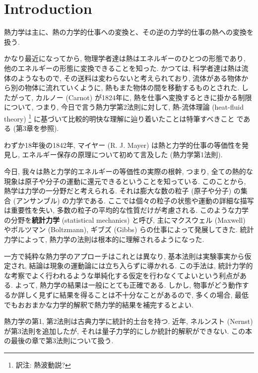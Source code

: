 \chapter{Introduction}
熱力学は主に、熱の力学的仕事への変換と、その逆の力学的仕事の熱への変換を扱う. \par
かなり最近になってから, 物理学者達は熱はエネルギーのひとつの形態であり, 他のエネルギーの形態に変換できることを知った. かつては, 科学者達は熱は流体のようなもので, その送料は変わらないと考えられており, 流体がある物体から別の物体に流れていくように, 熱もまた物体の間を移動するものとされた. したがって, カルノー (Carnot) が1824年に, 熱を仕事へ変換するときに掛かる制限について, つまり, 今日で言う熱力学第2法則に対して, 熱-流体理論 (heat-fluid theory) \footnote{訳注: 熱波動説?} に基づいて比較的明快な理解に辿り着いたことは特筆すべきことである (第3章を参照). \par
わずか18年後の1842年, マイヤー (R. J. Mayer) は熱と力学的仕事の等価性を発見し, エネルギー保存の原理について初めて言及した (熱力学第1法則). \par
今日, 我々は熱と力学的エネルギーの等価性の実際の根幹, つまり, 全ての熱的な現象は原子や分子の運動に還元できるということを知っている. このことから, 熱学は力学の一分野だと考えられる. それは膨大な数の粒子 (原子や分子) の集合 (アンサンブル) の力学である. ここでは個々の粒子の状態や運動の詳細な描写は重要性を失い, 多数の粒子の平均的な性質だけが考慮される. このような力学の分野を\textbf{統計力学} (statistical mechanics) と呼び, 主にマクスウェル (Maxwell) やボルツマン (Boltzmann), ギブズ (Gibbs) らの仕事によって発展してきた. 統計力学によって, 熱力学の法則は根本的に理解されるようになった. \par
一方で純粋な熱力学のアプローチはこれとは異なり, 基本法則は実験事実から仮定され, 結論は現象の運動論には立ち入らずに導かれる. この手法は, 統計力学的な考察でよく行われるような単純化する仮定を行わなくてよいという利点がある. よって, 熱力学の結果は一般にとても正確である. しかし, 物事がどう動作するか詳しく見ずに結果を得ることは不十分なことがあるので, 多くの場合, 最低でもおおまかな力学的解釈で熱力学的結果を補完するとよい. \par
熱力学の第1, 第2法則は古典力学に統計的土台を持つ. 近年, ネルンスト (Nernst) が第3法則を追加したが, それは量子力学的にしか統計的解釈ができない. この本の最後の章で第3法則について扱う. 


